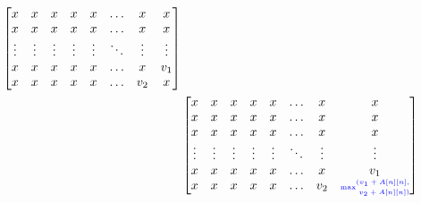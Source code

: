 \documentclass[a4paper]{article}
\begin{document}
\begin{enumerate}
\begin{enumerate}
\begin{align*}
\begin{bmatrix}
												x & x & x & x & x & \hdots & x & x\\
												x & x & x & x & x & \hdots & x & x \\
												\vdots&\vdots&\vdots&\vdots&\vdots&\ddots&\vdots&\vdots\\
												x & x & x & x & x & \hdots & x & v_1\\
												x & x & x & x & x & \hdots & v_2 & x\\
										\end{bmatrix} \\
										&
										\begin{bmatrix}
												x & x & x & x & x & \hdots & x & x\\
												x & x & x & x & x & \hdots & x & x\\
												x & x & x & x & x & \hdots & x & x \\
												\vdots&\vdots&\vdots&\vdots&\vdots&\ddots&\vdots&\vdots\\
												x & x & x & x & x & \hdots & x & v_1\\
												x & x & x & x & x & \hdots & v_2 & \text{\textcolor{blue}{\tiny max\stackanchor{$(v_1 + A[n][n],$}{ $ v_2 + A[n][n])$}}} \\
										\end{bmatrix}
								\end{align*}


\end{enumerate}
\end{enumerate}
\end{document}
